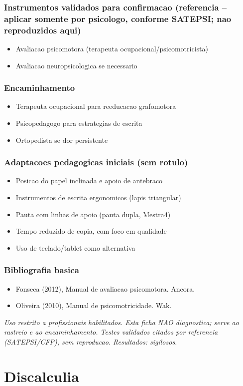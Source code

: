 \documentclass[a4paper,11pt]{book}
\newcommand{\avisolegal}{\par\medskip\noindent\footnotesize\itshape
\color{cinza}Uso restrito a profissionais habilitados. Esta ficha NAO diagnostica;
serve ao rastreio e ao encaminhamento. Testes validados citados por referencia
(SATEPSI/CFP), sem reproducao. Resultados: sigilosos.\color{black}\par}
\begin{document}
\subsection*{Instrumentos validados para confirmacao (referencia -- aplicar somente por psicologo, conforme SATEPSI; nao reproduzidos aqui)}
\begin{itemize}
\item Avaliacao psicomotora (terapeuta ocupacional/psicomotricista)
\item Avaliacao neuropsicologica se necessario
\end{itemize}
\subsection*{Encaminhamento}
\begin{itemize}
\item Terapeuta ocupacional para reeducacao grafomotora
\item Psicopedagogo para estrategias de escrita
\item Ortopedista se dor persistente
\end{itemize}
\subsection*{Adaptacoes pedagogicas iniciais (sem rotulo)}
\begin{itemize}
\item Posicao do papel inclinada e apoio de antebraco
\item Instrumentos de escrita ergonomicos (lapis triangular)
\item Pauta com linhas de apoio (pauta dupla, Mestra4)
\item Tempo reduzido de copia, com foco em qualidade
\item Uso de teclado/tablet como alternativa
\end{itemize}
\subsection*{Bibliografia basica}
\begin{itemize}
\item Fonseca (2012), Manual de avaliacao psicomotora. Ancora.
\item Oliveira (2010), Manual de psicomotricidade. Wak.
\end{itemize}
\avisolegal


\chapter{Discalculia}
\end{document}
